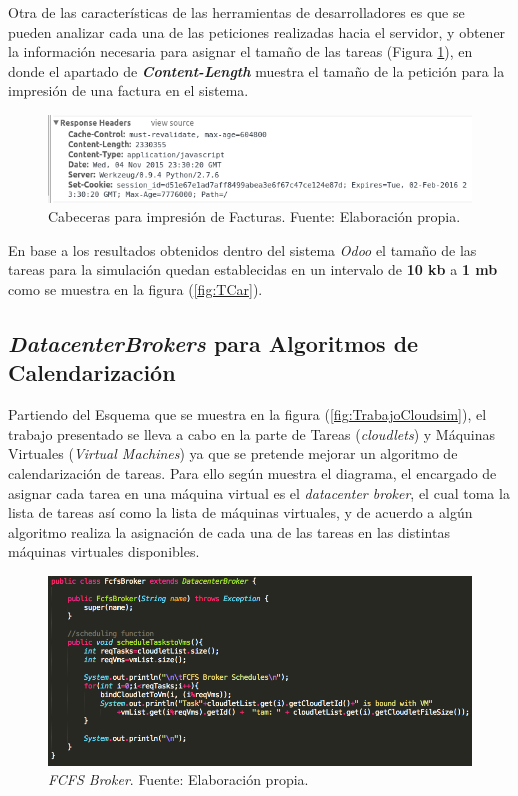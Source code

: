 Otra de las características de las herramientas de desarrolladores es que se pueden analizar cada una de las peticiones realizadas hacia el servidor, y obtener la información necesaria para asignar el tamaño de las tareas (Figura \ref{fig:HeaderRequest}), en donde el apartado de \textit{\textbf{Content-Length}} muestra el tamaño de la petición para la impresión de una factura en el sistema.

\renewcommand\thefigure{\arabic{figure}}
\begin{figure}[h!]
	\centering
	\includegraphics[scale=0.5]{media/odoo/7}
	\caption{Cabeceras para impresión de Facturas. Fuente: Elaboración propia.}
	\label{fig:HeaderRequest}
\end{figure}

En base a los resultados obtenidos dentro del sistema \textit{Odoo} el tamaño de las tareas para la simulación quedan establecidas en un intervalo de \textbf{10 kb} a \textbf{1 mb} como se muestra en la figura (\ref{fig:TCar}).


\subsection*{\textit{DatacenterBrokers} para Algoritmos de Calendarización}

Partiendo del Esquema que se muestra en la figura (\ref{fig:TrabajoCloudsim}), el trabajo presentado se lleva a cabo en la parte de Tareas (\textit{cloudlets}) y M\'aquinas Virtuales (\textit{Virtual Machines}) ya que se pretende mejorar un algoritmo de calendarizaci\'on de tareas.
Para ello seg\'un muestra el diagrama, el encargado de asignar cada tarea en una m\'aquina virtual es el \textit{datacenter broker}, el cual toma la lista de tareas as\'i como la lista de m\'aquinas virtuales, y de acuerdo a alg\'un algoritmo realiza la asignaci\'on de cada una de las tareas en las distintas m\'aquinas virtuales disponibles.

\renewcommand\thefigure{\arabic{figure}}
\begin{figure}[h!]
	\centering
	\includegraphics[scale=0.4]{media/FCFS_broker}
	\caption{\textit{FCFS Broker}. Fuente: Elaboración propia.}
	\label{fig:fcfsBroker}
\end{figure}

